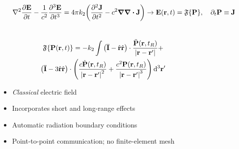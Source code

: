 \documentclass[aspectratio=169]{beamer}
\begin{document}
\begin{frame}
  \begin{equation*}
    \laplacian{\pdv{\vb{E}}{t}} - \frac{1}{c^2} \pdv[3]{\vb{E}}{t} = 4 \pi k_2 \qty(\pdv[2]{\vb{J}}{t} - c^2 \grad \div \vb{J}) \to \vb{E}(\vb{r}, t) = \mathfrak{F}\qty{\vb{P}}, \quad \partial_t \vb{P} \equiv \vb{J}
  \end{equation*}
  \vspace{-0.8cm}
  \begin{columns}
    \begin{column}{0.7\textwidth}
      \begin{equation*}
        \end{equation*}
        \begin{gather*}
          \mathfrak{F}\qty{\vb{P}(\vb{r}, t)} = -k_2 \int
              \left(\overline{\mathbf{I}} -  \hat{\mathbf{r}}\hat{\mathbf{r}}\right) \cdot \frac{\ddot{\mathbf{P}}(\vb{r}, t_R)}{\left|\mathbf{r}-\mathbf{r}'\right|} + \\
              \left(\overline{\mathbf{I}} - 3\hat{\mathbf{r}}\hat{\mathbf{r}}\right) \cdot \qty(
                \frac{c\dot{\mathbf{P}}(\vb{r}, t_R)}{\left|\mathbf{r}-\mathbf{r}'\right|^2} +
                \frac{c^2   \mathbf{P}(\vb{r}, t_R)}{\left|\mathbf{r}-\mathbf{r}'\right|^3}
              )
            \, \mathrm{d}^3 \mathbf{r'}
        \end{gather*}
        \begin{itemize}
          \item \emph{Classical} electric field
          \item Incorporates short and long-range effects
          \item Automatic radiation boundary conditions
          \item Point-to-point communication; no finite-element mesh
        \end{itemize}
    \end{column}
    \begin{column}{0.3\textwidth}
      \centering

\end{column}
\end{columns}
\end{frame}
\end{document}
